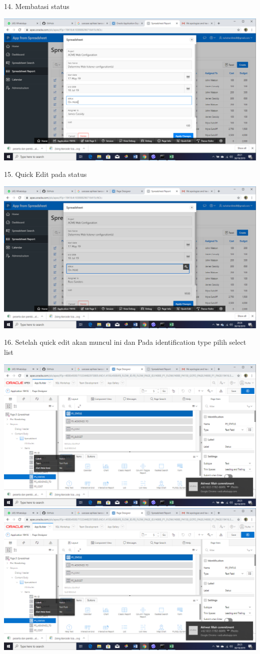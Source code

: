 \documentclass{article}
\begin{document}
\item 14. Membatasi status
\begin{center}
     \includegraphics[width=10cm\textwidth]{figure/29.png}
\end{center}

\item 15. Quick Edit pada status
\begin{center}
    \includegraphics[width=10cm\textwidth]{figure/30.png}
\end{center}

\item 16. Setelah quick edit akan muncul ini dan  Pada identification type pilih select list

\begin{center}
    \includegraphics[width=10cm\textwidth]{figure/31.png}
    \includegraphics[width=10cm\textwidth]{figure/32.png}
\end{center}
\end{document}
